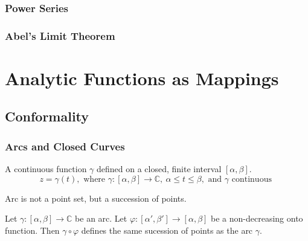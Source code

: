 \subsubsection{Power Series}
\subsubsection{Abel's Limit Theorem}
\section{Analytic Functions as Mappings}
\setcounter{subsection}{1}
\subsection{Conformality}
\subsubsection{Arcs and Closed Curves}
\begin{definition}[Arc]
	A continuous function $\gamma$ defined on a closed, finite interval $[\alpha,\beta]$.	
	\begin{equation}
		z = \gamma(t), \text{ where } \gamma : [\alpha,\beta] \to \mathbb{C},\ \alpha \le t \le \beta,\text{ and } \gamma \text{ continuous }
	\end{equation}
\end{definition}

\begin{remark}
	Arc is not a point set, but a succession of points.
\end{remark}

\begin{definition}
	Let $\gamma : [\alpha,\beta] \to \mathbb{C}$ be an arc.
	Let $\varphi : [\alpha',\beta'] \to [\alpha,\beta]$ be a non-decreasing onto function.
	Then $\gamma \circ \varphi$ defines the same sucession of points as the arc $\gamma$.

\end{definition}



